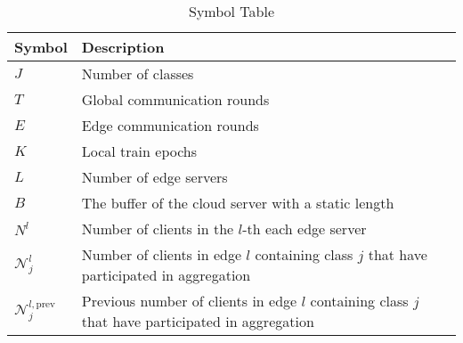 \documentclass[journal]{IEEEtran}
\begin{document}
\begin{table}[H]
  \caption{Symbol Table}
  \centering
  \renewcommand{\arraystretch}{1.2}
  \begin{tabular}{|@{}m{1cm}<{\centering}|m{6.5cm}|}
    \hline
    \textbf{Symbol}                       & \textbf{Description}                                                                                                                  \\
    \hline
    \( J \)                               & Number of classes                                                                                                                     \\
    \hline
    \( T \)                               & Global communication rounds                                                                                                                         \\
    \hline
     \( E \)                               & Edge communication rounds                                                                                                                           \\
    \hline
     \( K \)                               & Local train epochs                                                                                                                          \\
    \hline
     \( L \)                               & Number of edge servers                                                                                                                \\
    \hline
     \( B \)                               & The buffer of the cloud server with a static length                                                                                   \\
    \hline
     \( N^l \)                             & Number of clients in the $l$-th each edge server                                                                                      \\
    \hline
   \( \mathcal{N}_j^l  \)                & Number of clients in edge $l$ containing class $j$ that have participated in aggregation                                              \\
    \hline
    \( {\mathcal{N}_j^{l,\text{prev}}}  \) & Previous number of clients in edge $l$ containing class $j$ that have participated in aggregation                                         \\
    \hline


\end{tabular}
\end{table}
\end{document}
